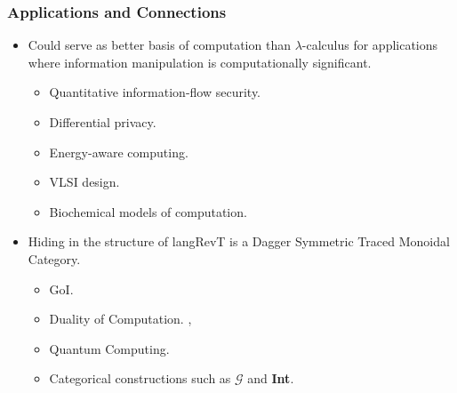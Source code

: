 \documentclass[svgnames,11pt]{beamer}
\newcommand{\lcal}{\ensuremath{\lambda}-calculus\xspace}
\begin{document}
\begin{frame}
\frametitle{Applications and Connections}

\begin{itemize}

\vfill
\item Could serve as better basis of computation than \lcal for
  applications where information manipulation is computationally
  significant.

  \begin{itemize}
  \item Quantitative information-flow security.~\cite{myerssab}
  \item Differential privacy.~\cite{dwork:differential}
  \item Energy-aware computing.~\cite{1324180,605411}
  \item VLSI design.~\cite{Macii:1996:ECE:874066.875828}
  \item Biochemical models of computation.~\cite{bio}

  \end{itemize}

\vfill

\item Hiding in the structure of {{langRevT}} is a Dagger Symmetric
  Traced Monoidal Category.

  \begin{itemize}
  \item GoI. \cite{girard1989geometry}

  \item Duality of Computation. \cite{Filinski:1989:DCI:648332.755574}, \cite{Curien:2000}

  \item Quantum Computing. 

  \item Categorical constructions such as \ensuremath{\mathcal{G}} and \textbf{Int}. 

  \end{itemize}

\end{itemize}

\vfill

\end{frame}


\begin{frame}

\vfill
  \begin{center}
  \end{center}
\vfill

\end{frame}
\end{document}

